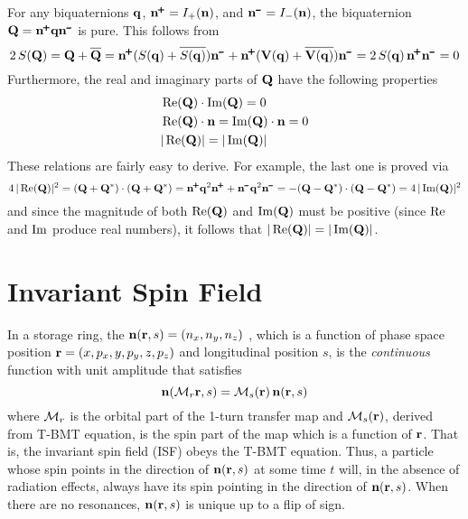 For any biquaternions ${\bf q}$, $\bfn^\ppls = I_+(\bfn)$, and $\bfn^\mmin = I_-(\bfn)$, the biquaternion $\bfQ =
\bfn^\ppls \bfq \bfn^\mmin$ is pure. This follows from
\begin{equation}
  2 \, S(\bfQ) = \bfQ + \BAR\bfQ = 
  \bfn^\ppls (S(\bfq) + \BAR{S(\bfq)}) \bfn^\mmin + \bfn^\ppls (\bfV(\bfq) + \BAR{\bfV(\bfq)}) \bfn^\mmin
  = 2 \, S(\bfq) \, \bfn^\ppls \bfn^\mmin = 0
  \label{2sgg}
\end{equation}
Furthermore, the real and imaginary parts of ${\bf Q}$ have the following properties
\begin{align}
  & \operatorname{Re}({\bf Q}) \cdot \operatorname{Im}({\bf Q}) = 0 \nonumber \\
  & \operatorname{Re}({\bf Q}) \cdot {\bf n} = \operatorname{Im}({\bf Q}) \cdot {\bf n} = 0 
  \label{GG0} \\
  & |\operatorname{Re}({\bf Q})| = |\operatorname{Im}({\bf Q})| \nonumber
\end{align}
These relations are fairly easy to derive. For example, the last one is proved via
\begin{equation}
  4 \, | \re(\bfQ) |^2 = (\bfQ + \bfQ^*) \cdot (\bfQ + \bfQ^*) =
  \bfn^\ppls \bfq^2 \bfn^\ppls + \bfn^\mmin \bfq^2 \bfn^\mmin =
  -(\bfQ - \bfQ^*) \cdot (\bfQ - \bfQ^*) =
  4 \, | \im(\bfQ) |^2
  \label{4ggg}
\end{equation}
and since the magnitude of both $\operatorname{Re}({\bf Q})$ and $\operatorname{Im}({\bf Q})$ must be positive (since $\operatorname{Re}$ and $\operatorname{Im}$
produce real numbers), it follows that $|\operatorname{Re}({\bf Q})| = |\operatorname{Im}({\bf Q})|$.


\section{Invariant Spin Field}
\label{s:isf}

In a storage ring, the  ${\bf n}({\bf r}, s) = (n_x, n_y, n_z)$
\cite{b:spin.hoff,b:duan15}, which is a function of phase space position ${\bf r} = (x, p_x, y, p_y, z,
p_z)$ and longitudinal position $s$, is the {\em continuous} function with unit amplitude that
satisfies
\begin{equation}
  {\bf n}({\cal M}_r {\bf r}, s) = {\cal M}_s({\bf r}) \, {\bf n}({\bf r}, s)
  \label{nmrs}
\end{equation}
where ${\cal M}_r$ is the orbital part of the 1-turn transfer map and ${\cal M}_s({\bf r})$, derived from
T-BMT equation, is the spin part of the map which is a function of ${\bf r}$. That is, the invariant
spin field (ISF) obeys the T-BMT equation. Thus, a particle whose spin points in the direction of
${\bf n}({\bf r}, s)$ at some time $t$ will, in the absence of radiation effects, always have its spin
pointing in the direction of ${\bf n}({\bf r}, s)$. When there are no resonances, ${\bf n}({\bf r}, s)$ is
unique up to a flip of sign.

